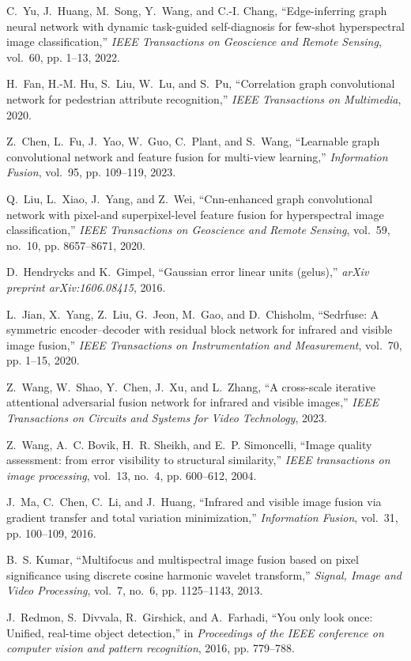 \documentclass[journal]{IEEEtran}
\begin{document}
\begin{thebibliography}{10}
C.~Yu, J.~Huang, M.~Song, Y.~Wang, and C.-I. Chang, ``Edge-inferring graph
  neural network with dynamic task-guided self-diagnosis for few-shot
  hyperspectral image classification,'' \emph{IEEE Transactions on Geoscience
  and Remote Sensing}, vol.~60, pp. 1--13, 2022.

H.~Fan, H.-M. Hu, S.~Liu, W.~Lu, and S.~Pu, ``Correlation graph convolutional
  network for pedestrian attribute recognition,'' \emph{IEEE Transactions on
  Multimedia}, 2020.

Z.~Chen, L.~Fu, J.~Yao, W.~Guo, C.~Plant, and S.~Wang, ``Learnable graph
  convolutional network and feature fusion for multi-view learning,''
  \emph{Information Fusion}, vol.~95, pp. 109--119, 2023.

Q.~Liu, L.~Xiao, J.~Yang, and Z.~Wei, ``Cnn-enhanced graph convolutional
  network with pixel-and superpixel-level feature fusion for hyperspectral
  image classification,'' \emph{IEEE Transactions on Geoscience and Remote
  Sensing}, vol.~59, no.~10, pp. 8657--8671, 2020.

D.~Hendrycks and K.~Gimpel, ``Gaussian error linear units (gelus),''
  \emph{arXiv preprint arXiv:1606.08415}, 2016.

L.~Jian, X.~Yang, Z.~Liu, G.~Jeon, M.~Gao, and D.~Chisholm, ``Sedrfuse: A
  symmetric encoder--decoder with residual block network for infrared and
  visible image fusion,'' \emph{IEEE Transactions on Instrumentation and
  Measurement}, vol.~70, pp. 1--15, 2020.

Z.~Wang, W.~Shao, Y.~Chen, J.~Xu, and L.~Zhang, ``A cross-scale iterative
  attentional adversarial fusion network for infrared and visible images,''
  \emph{IEEE Transactions on Circuits and Systems for Video Technology}, 2023.

Z.~Wang, A.~C. Bovik, H.~R. Sheikh, and E.~P. Simoncelli, ``Image quality
  assessment: from error visibility to structural similarity,'' \emph{IEEE
  transactions on image processing}, vol.~13, no.~4, pp. 600--612, 2004.

J.~Ma, C.~Chen, C.~Li, and J.~Huang, ``Infrared and visible image fusion via
  gradient transfer and total variation minimization,'' \emph{Information
  Fusion}, vol.~31, pp. 100--109, 2016.

B.~S. Kumar, ``Multifocus and multispectral image fusion based on pixel
  significance using discrete cosine harmonic wavelet transform,''
  \emph{Signal, Image and Video Processing}, vol.~7, no.~6, pp. 1125--1143,
  2013.

J.~Redmon, S.~Divvala, R.~Girshick, and A.~Farhadi, ``You only look once:
  Unified, real-time object detection,'' in \emph{Proceedings of the IEEE
  conference on computer vision and pattern recognition}, 2016, pp. 779--788.

\end{thebibliography}
\end{document}
